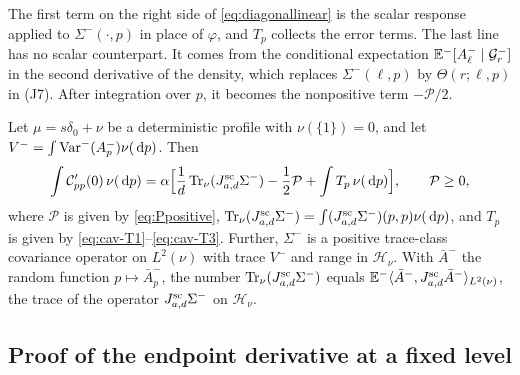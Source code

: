 The first term on the right side of \eqref{eq:diagonallinear} is the
scalar response applied to $\Sigma^-(\cdot,p)$ in place of $\varphi$,
and $T_p$ collects the error terms. The last line has no scalar
counterpart. It comes from the conditional expectation
$\mathbb E^-[A_\ell^-\mid\mathcal G^-_r]$ in the second derivative of the density,
which replaces $\Sigma^-(\ell,p)$ by $\Theta(r;\ell,p)$ in (J7). After
integration over $p$, it becomes the nonpositive term
$-\mathcal P/2$.

\begin{lemma}\label{lem:linear}
Let $\mu=s\delta_0+\nu$ be a deterministic profile with
$\nu(\{1\})=0$, and let $V^-=\int\operatorname{Var}^-(A_p^-)\nu(\,\mathrm d p)$. Then
\begin{equation}\label{eq:lineartrace}
 \int\mathcal C_{pp}'(0)\,\nu(\,\mathrm d p)
 =\alpha\Bigl[\frac1d\operatorname{Tr}_\nu(J^{\mathrm{sc}}_{a,d}\Sigma^-)
                     -\frac12\mathcal P+\int T_p\,\nu(\,\mathrm d p)\Bigr],
 \qquad \mathcal P\ge0,
\end{equation}
where $\mathcal P$ is given by \eqref{eq:Ppositive},
$\operatorname{Tr}_\nu(J^{\mathrm{sc}}_{a,d}\Sigma^-)
=\int(J^{\mathrm{sc}}_{a,d}\Sigma^-)(p,p)\nu(\,\mathrm d p)$, and $T_p$ is given by
\eqref{eq:cav-T1}--\eqref{eq:cav-T3}. Further, $\Sigma^-$ is a positive
trace-class covariance operator on $L^2(\nu)$ with trace $V^-$ and range
in $\mathcal H_\nu$. With $\bar A^-$ the random function
$p\mapsto\bar A_p^-$, the number $\operatorname{Tr}_\nu(J^{\mathrm{sc}}_{a,d}\Sigma^-)$
equals $\mathbb E^-\langle\bar A^-,J^{\mathrm{sc}}_{a,d}\bar A^-\rangle_{L^2(\nu)}$,
the trace of the operator $J^{\mathrm{sc}}_{a,d}\Sigma^-$ on $\mathcal H_\nu$.
\end{lemma}

\subsection{Proof of the endpoint derivative at a fixed level}

